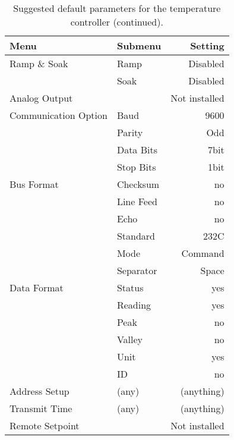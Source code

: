 \begin{table}
\begin{center}
\begin{tabular}{|l|l|r|}
\hline
Menu & Submenu & Setting \\
\hline
Ramp \& Soak        & Ramp                   & Disabled \\
                    & Soak                   & Disabled \\
\hline
Analog Output         &                      & Not installed \\
\hline
Communication Option  & Baud                 & 9600 \\
                      & Parity               & Odd  \\
                      & Data Bits            & 7bit \\
                      & Stop Bits            & 1bit \\
\hline
Bus Format            & Checksum             & no  \\
                      & Line Feed            & no   \\
                      & Echo                 & no   \\
                      & Standard             & 232C \\
                      & Mode                 & Command \\
                      & Separator            & Space   \\
\hline
Data Format           & Status               & yes     \\
                      & Reading              & yes     \\
                      & Peak                 & no      \\
                      & Valley               & no      \\
                      & Unit                 & yes     \\
                      & ID                   & no      \\
\hline
Address Setup         & (any)                & (anything) \\
\hline
Transmit Time         & (any)                & (anything) \\
\hline
Remote Setpoint       &                      & Not installed \\
\hline\hline
\end{tabular}
\end{center}
\caption{Suggested default parameters for the temperature controller 
(continued).}
\label{tab:ctlparam2}
\end{table}

